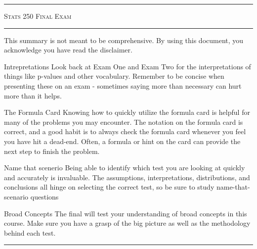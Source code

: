 \documentclass[landscape]{article}
\title{}
\author{}
\newcommand{\myline}{\vspace{4pt}\hrule  \vspace{4pt}}
\newcommand{\topic}[2]{
\noindent \textbf{\textsc{\color{harvardcrimson}{#1}}}

\noindent \hspace{-3.5pt}  #2

\myline
}
\newenvironment{compactdesc}{
	\begin{description}[leftmargin=*,labelsep=10pt]
	}{
	\end{description}
}
\begin{document}
	\footnotesize
	
	\begin{multicols*}{3}
		
		\myline
		\vspace{-0.15cm}
		\begin{center}
			\LARGE \textsc{Stats 250 Final Exam} 
		\end{center}
		\vspace{-0.15cm}
		\myline 
		
		
		\topic{Introduction}{
			This summary is not meant to be comprehensive. By using this document, you acknowledge you have read the disclaimer.
			\begin{compactdesc}
				\item[Intrepretations] Look back at Exam One and Exam Two for the interpretations of things like p-values and other vocabulary. Remember to be concise when presenting these on an exam - sometimes saying more than necessary can hurt more than it helps.
				\item[The Formula Card] Knowing how to quickly utilize the formula card is helpful for many of the problems you may encounter. The notation on the formula card is correct, and a good habit is to always check the formula card whenever you feel you have hit a dead-end. Often, a formula or hint on the card can provide the next step to finish the problem. 
				\item[Name that scenerio] Being able to identify which test you are looking at quickly and accurately is invaluable. The assumptions, interpretations, distributions, and conclusions all hinge on selecting the correct test, so be sure to study name-that-scenario questions
				\item[Broad Concepts] The final will test your understanding of broad concepts in this course. Make sure you have a grasp of the big picture as well as the methodology behind each test. 
			\end{compactdesc}
		}
		

\end{multicols*}
\end{document}
